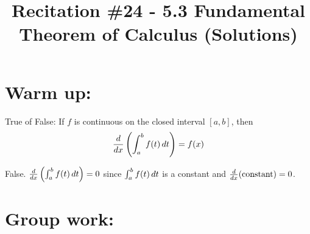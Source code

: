 \documentclass[nooutcomes]{ximera}
\title{Recitation \#24 - 5.3 Fundamental Theorem of Calculus (Solutions)}
\begin{document}
\begin{abstract}		\end{abstract}
\maketitle

\section*{Warm up:} 
True of False:  If $f$ is continuous on the closed interval $[a,b]$, then 
$$\frac{d}{dx} \left( \int_a^b f(t) \,d t \right) = f(x)$$
		\begin{freeResponse}
		False.  $\frac{d}{dx} \left( \int_a^b f(t) \,d t \right) = 0$ since $\int_a^b f(t) \,d t$ is a constant and $\frac{d}{dx} (\text{constant}) = 0$.
		\end{freeResponse}	
		
		
		

	
	
	
	
	

\section*{Group work:}
\end{document}
